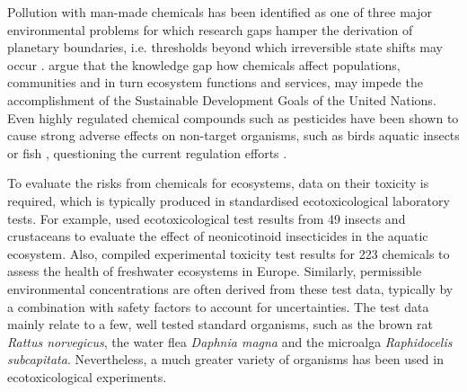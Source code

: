 \documentclass[journal,datadescriptor,accept,moreauthors,pdftex]{Definitions/mdpi}
\begin{document}
Pollution with man-made chemicals has been identified as one of three major environmental problems for which research gaps hamper the derivation of planetary boundaries, i.e. thresholds beyond which irreversible state shifts may occur \citep{steffen_anthropocene_2007, steffen_planetary_2015}. \citet{bernhardt_synthetic_2017} argue that the knowledge gap how chemicals affect populations, communities and in turn ecosystem functions and services, may impede the accomplishment of the Sustainable Development Goals \citep{rosa_transforming_2017} of the United Nations. Even highly regulated chemical compounds such as pesticides have been shown to cause strong adverse effects on non-target organisms, such as birds \citep{hallmann_declines_2014} aquatic insects \citep{beketov_pesticides_2013} or fish \citep{yamamuro_neonicotinoids_2019}, questioning the current regulation efforts \citep{schafer_future_2019}.

To evaluate the risks from chemicals for ecosystems, data on their toxicity is required, which is typically produced in standardised ecotoxicological laboratory tests. For example, \citet{morrissey_neonicotinoid_2015} used ecotoxicological test results from 49 insects and crustaceans to evaluate the effect of neonicotinoid insecticides in the aquatic ecosystem. Also, \citet{malaj_organic_2014} compiled experimental toxicity test results for 223 chemicals to assess the health of freshwater ecosystems in Europe. Similarly, permissible environmental concentrations are often derived from these test data, typically by a combination with safety factors to account for uncertainties. The test data mainly relate to a few, well tested standard organisms, such as the brown rat \textit{Rattus norvegicus}, the water flea \textit{Daphnia magna} and the microalga \textit{Raphidocelis subcapitata}. Nevertheless, a much greater variety of organisms has been used in ecotoxicological experiments.
\end{document}
